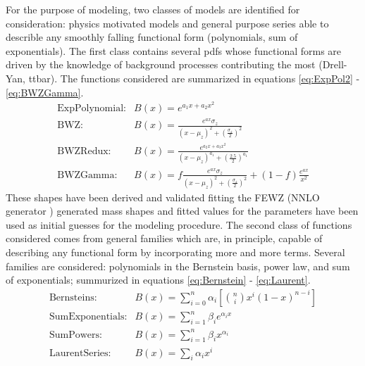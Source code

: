 For the purpose of modeling, two classes of models are identified for consideration: physics motivated models and general purpose series able to describle any smoothly falling functional form (polynomials, sum of exponentials). The first class contains several pdfs whose functional forms are driven by the knowledge of background processes contributing the most (Drell-Yan, ttbar). The functions considered are summarized in equations \ref{eq:ExpPol2} - \ref{eq:BWZGamma}.
\begin{align}
        \label{eq:ExpPol2}
        \text{ExpPolynomial:}& {B(x)} = {e^{a_{1}x + a_{2}x^2}} \\
        \label{eq:BWZ}
        \text{BWZ:}& {B(x)} = {\frac{e^{ax}\sigma_{z}}{(x-\mu_{z})^2 + (\frac{\sigma_{z}}{2})^2}} \\
        \label{eq:BWZRedux}
        \text{BWZRedux:}& {B(x)} = {\frac{e^{a_{2}x + a_{3}x^2}}{(x-\mu_{z})^{a_{1}} + (\frac{2.5}{2})^{a_{1}}}} \\
        \label{eq:BWZGamma}
        \text{BWZGamma:}& {B(x)} = {f\frac{e^{ax}\sigma_{z}}{(x-\mu_{z})^2 + (\frac{\sigma_{z}}{2})^2} + (1-f)\frac{e^{ax}}{x^2}}
\end{align}
These shapes have been derived and validated fitting the FEWZ (NNLO generator \cite{Gavin:2010az}) generated mass shapes and fitted values for the parameters have been used as initial guesses for the modeling procedure. The second class of functions considered comes from general families which are, in principle, capable of describing any functional form by incorporating more and more terms. Several families are considered: polynomials in the Bernstein basis, power law, and sum of exponentials; summurized in equations \ref{eq:Bernstein} - \ref{eq:Laurent}.
\begin{align}
        \label{eq:Bernstein}
        \text{Bernsteins:}& {B(x)} = {\sum_{i=0}^{n} \alpha_i[\binom{n}{i}x^{i}(1-x)^{n-i}]} \\
        \label{eq:SumExponentials}
        \text{SumExponentials:}& {B(x)} = {\sum_{i=1}^{n} \beta_{i}e^{\alpha_{i}x}}\\
        \label{eq:SumPowers}
        \text{SumPowers:}& {B(x)} = {\sum_{i=1}^{n} \beta_{i}x^{\alpha_{i}}}\\
        \label{eq:Laurent}
        \text{LaurentSeries:}& {B(x)} = {\sum_{i} \alpha_{i}x^{i}}
\end{align}

